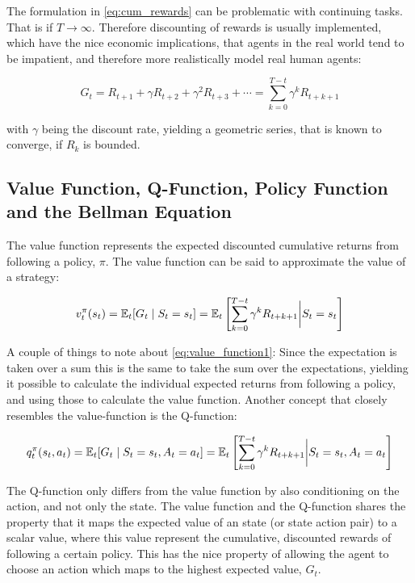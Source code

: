 The formulation in \eqref{eq:cum_rewards} can be problematic with continuing tasks. That is if $T \rightarrow \infty$. Therefore discounting of rewards is usually implemented, which have the nice economic implications, that agents in the real world tend to be impatient, and therefore more realistically model real human agents:

\begin{equation}
    G_t = R_{t+1} + \gamma R_{t+2} + \gamma^2 R_{t+3} + \cdots = \sum_{k=0}^{T - t} \gamma^k R_{t+k+1}
\end{equation}

with $\gamma$ being the discount rate, yielding a geometric series, that is known to converge, if $R_k$ is bounded.

\subsection{Value Function, Q-Function, Policy Function and the Bellman Equation}

The value function represents the expected discounted cumulative returns from following a policy, $\pi$. The value function can be said to approximate the value of a strategy:

\begin{equation}\label{eq:value_function1}
    v_{t}^{\pi}(s_t) = \mathbb{E}_t [G_t \mid S_t = s_t] = \mathbb{E}_t \left[ \sum_{k=0}^{T - t} \gamma^k R_{t+k+1} \bigg\vert S_t = s_t \right] 
\end{equation}


A couple of things to note about \eqref{eq:value_function1}: Since the expectation is taken over a sum this is the same to take the sum over the expectations, yielding it possible to calculate the individual expected returns from following a policy, and using those to calculate the value function. Another concept that closely resembles the value-function is the Q-function:

\begin{equation}
    q_t^{\pi} (s_t, a_t) = \mathbb{E}_t [G_t \mid S_t = s_t, A_t = a_t ] = \mathbb{E}_t \left[ \sum_{k=0}^{T - t} \gamma^k R_{t+k+1} \bigg\vert S_t = s_t, A_t = a_t\right] 
\end{equation}

The Q-function only differs from the value function by also conditioning on the action, and not only the state. The value function and the Q-function shares the property that it maps the expected value of an state (or state action pair) to a scalar value, where this value represent the cumulative, discounted rewards of following a certain policy. This has the nice property of allowing the agent to choose an action which maps to the highest expected value, $G_t$.

